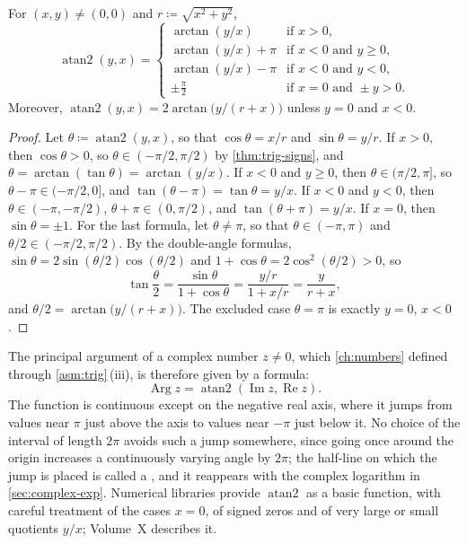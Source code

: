 \begin{proposition}
\label{prop:atan2}
For $(x,y)\ne(0,0)$ and $r\coloneqq\sqrt{x^2+y^2}$,
\[
\operatorname{atan2}(y,x)=\begin{cases}
\arctan(y/x)&\text{if }x>0,\\
\arctan(y/x)+\pi&\text{if }x<0\text{ and }y\ge0,\\
\arctan(y/x)-\pi&\text{if }x<0\text{ and }y<0,\\
\pm\frac\pi2&\text{if }x=0\text{ and }\pm y>0 .
\end{cases}
\]
Moreover, $\operatorname{atan2}(y,x)=2\arctan\bigl(y/(r+x)\bigr)$ unless $y=0$ and $x<0$.
\end{proposition}

\begin{proof}
Let $\theta\coloneqq\operatorname{atan2}(y,x)$, so that $\cos\theta=x/r$ and $\sin\theta=y/r$. If $x>0$, then $\cos\theta>0$, so $\theta\in(-\pi/2,\pi/2)$ by \cref{thm:trig-signs}, and $\theta=\arctan(\tan\theta)=\arctan(y/x)$. If $x<0$ and $y\ge0$, then $\theta\in(\pi/2,\pi]$, so $\theta-\pi\in(-\pi/2,0]$, and $\tan(\theta-\pi)=\tan\theta=y/x$. If $x<0$ and $y<0$, then $\theta\in(-\pi,-\pi/2)$, $\theta+\pi\in(0,\pi/2)$, and $\tan(\theta+\pi)=y/x$. If $x=0$, then $\sin\theta=\pm1$. For the last formula, let $\theta\ne\pi$, so that $\theta\in(-\pi,\pi)$ and $\theta/2\in(-\pi/2,\pi/2)$. By the double-angle formulas, $\sin\theta=2\sin(\theta/2)\cos(\theta/2)$ and $1+\cos\theta=2\cos^2(\theta/2)>0$, so
\[
\tan\frac\theta2=\frac{\sin\theta}{1+\cos\theta}=\frac{y/r}{1+x/r}=\frac y{r+x},
\]
and $\theta/2=\arctan\bigl(y/(r+x)\bigr)$. The excluded case $\theta=\pi$ is exactly $y=0$, $x<0$.
\end{proof}

The principal argument of a complex number $z\ne0$, which \cref{ch:numbers} defined through \cref{asm:trig}\,(iii), is therefore given by a formula:
\[
\operatorname{Arg}z=\operatorname{atan2}(\operatorname{Im}z,\operatorname{Re}z).
\]
The function is continuous except on the negative real axis, where it jumps from values near $\pi$ just above the axis to values near $-\pi$ just below it. No choice of the interval of length $2\pi$ avoids such a jump somewhere, since going once around the origin increases a continuously varying angle by $2\pi$; the half-line on which the jump is placed is called a , and it reappears with the complex logarithm in \cref{sec:complex-exp}. Numerical libraries provide $\operatorname{atan2}$ as a basic function, with careful treatment of the cases $x=0$, of signed zeros and of very large or small quotients $y/x$; Volume~X describes it.

